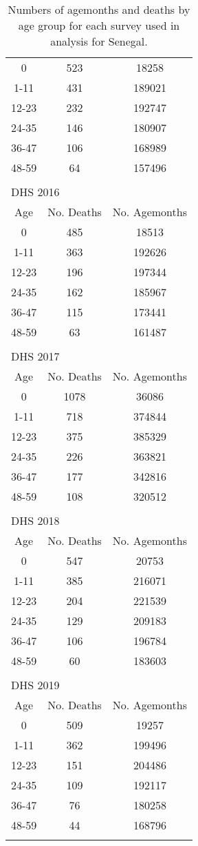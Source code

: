 \documentclass[
]{article}
\begin{document}
\begin{table}[!ht]
\begin{tabular}{ccc}
0 & 523 & 18258 \\ 
  1-11 & 431 & 189021 \\ 
  12-23 & 232 & 192747 \\ 
  24-35 & 146 & 180907 \\ 
  36-47 & 106 & 168989 \\ 
  48-59 & 64 & 157496 \\ 
   \hline\\ 
\multicolumn{3}{l}{DHS 2016}\\ 
\hline
Age & No. Deaths & No. Agemonths \\\hline
0 & 485 & 18513 \\ 
  1-11 & 363 & 192626 \\ 
  12-23 & 196 & 197344 \\ 
  24-35 & 162 & 185967 \\ 
  36-47 & 115 & 173441 \\ 
  48-59 & 63 & 161487 \\ 
   \hline\\ 
\multicolumn{3}{l}{DHS 2017}\\ 
\hline
Age & No. Deaths & No. Agemonths \\\hline
0 & 1078 & 36086 \\ 
  1-11 & 718 & 374844 \\ 
  12-23 & 375 & 385329 \\ 
  24-35 & 226 & 363821 \\ 
  36-47 & 177 & 342816 \\ 
  48-59 & 108 & 320512 \\ 
   \hline\\ 
\multicolumn{3}{l}{DHS 2018}\\ 
\hline
Age & No. Deaths & No. Agemonths \\\hline
0 & 547 & 20753 \\ 
  1-11 & 385 & 216071 \\ 
  12-23 & 204 & 221539 \\ 
  24-35 & 129 & 209183 \\ 
  36-47 & 106 & 196784 \\ 
  48-59 & 60 & 183603 \\ 
   \hline\\ 
\multicolumn{3}{l}{DHS 2019}\\ 
\hline
Age & No. Deaths & No. Agemonths \\\hline
0 & 509 & 19257 \\ 
  1-11 & 362 & 199496 \\ 
  12-23 & 151 & 204486 \\ 
  24-35 & 109 & 192117 \\ 
  36-47 & 76 & 180258 \\ 
  48-59 & 44 & 168796 \\ 
   \hline
\multicolumn{3}{l}{}\\
\end{tabular}
\caption{Numbers of agemonths and deaths by age group for each survey used in analysis for Senegal.} 
\end{table}
\end{document}
